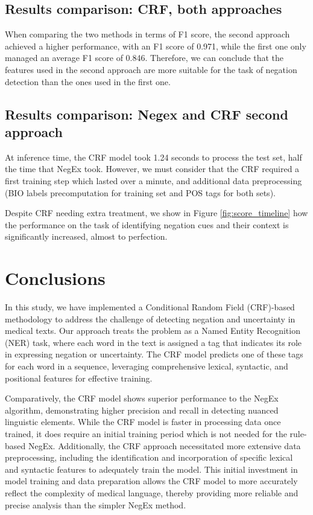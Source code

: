 \documentclass{article}
\begin{document}
\subsection*{Results comparison: CRF, both approaches}
When comparing the two methods in terms of F1 score, the second approach achieved a higher performance,
with an F1 score of 0.971, while the first one only managed an average F1 score of 0.846. Therefore, we
can conclude that the features used in the second approach are more suitable for the task of negation
detection than the ones used in the first one.

\subsection*{Results comparison: Negex and CRF second approach}

At inference time, the CRF model took 1.24 seconds to process the test set, half the time that NegEx took.
However, we must consider that the CRF required a first training step which lasted over a minute, and additional
data preprocessing (BIO labels precomputation for training set and POS tags for both sets).

Despite CRF needing extra treatment, we show in Figure \ref{fig:score_timeline} how the performance on the
task of identifying negation cues and their context is significantly increased, almost to perfection.

\section*{Conclusions}
In this study, we have implemented a Conditional Random Field (CRF)-based methodology to address the challenge
of detecting negation and uncertainty in medical texts. Our approach treats the problem as a Named Entity
Recognition (NER) task, where each word in the text is assigned a tag that indicates its role in expressing
negation or uncertainty. The CRF model predicts one of these tags for each word in a sequence, leveraging
comprehensive lexical, syntactic, and positional features for effective training.

Comparatively, the CRF model shows superior performance to the NegEx algorithm, demonstrating higher precision
and recall in detecting nuanced linguistic elements. While the CRF model is faster in processing data once
trained, it does require an initial training period which is not needed for the rule-based NegEx. Additionally,
the CRF approach necessitated more extensive data preprocessing, including the identification and incorporation
of specific lexical and syntactic features to adequately train the model. This initial investment in model
training and data preparation allows the CRF model to more accurately reflect the complexity of medical language,
thereby providing more reliable and precise analysis than the simpler NegEx method.
\end{document}
